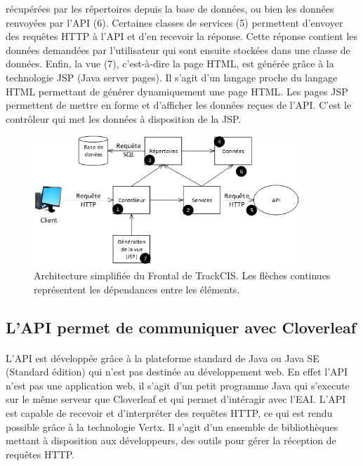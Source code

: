 			récupérées par les répertoires depuis la base de données, ou bien les
			données renvoyées par l'API (6). Certaines classes de services (5)
			permettent d'envoyer des requêtes HTTP à l'API et d'en recevoir la réponse.
			Cette réponse contient les données demandées par l'utilisateur qui sont
			ensuite stockées dans une classe de données. Enfin, la vue (7), c'est-à-dire
			la page HTML, est générée grâce à la technologie JSP (Java server pages). Il
			s'agit d'un langage proche du langage HTML permettant de générer
			dynamiquement une page HTML.
			Les pages JSP permettent de mettre en forme et d'afficher les données reçues
			de l'API. C'est le contrôleur qui met les données à disposition de la JSP.
			\begin{figure}[H]
				\centering
				\includegraphics[width=10cm]{../img/part3/archi_actuelle_front.png}
				\caption{\label{archi_actuelle_front} Architecture simplifiée du Frontal
				de TrackCIS. Les flèches continues représentent les dépendances entre les
				éléments.}
			\end{figure}
			
		\subsection{L'API permet de communiquer avec Cloverleaf}
			\paragraph{}%
			L'API est développée grâce à la plateforme standard de Java ou Java SE
			(Standard édition) qui n'est pas destinée au développement web. En effet
			l'API n'est pas une application web, il s'agit d'un petit programme Java qui
			s'execute sur le même serveur que Cloverleaf et qui permet d'intéragir avec
			l'EAI. L'API est capable de recevoir et d'interpréter des requêtes
			HTTP, ce qui est rendu possible grâce à la technologie Vertx. Il s'agit
			d'un ensemble de bibliothèques mettant à disposition aux
			développeurs, des outils pour gérer la réception de requêtes HTTP.
			
